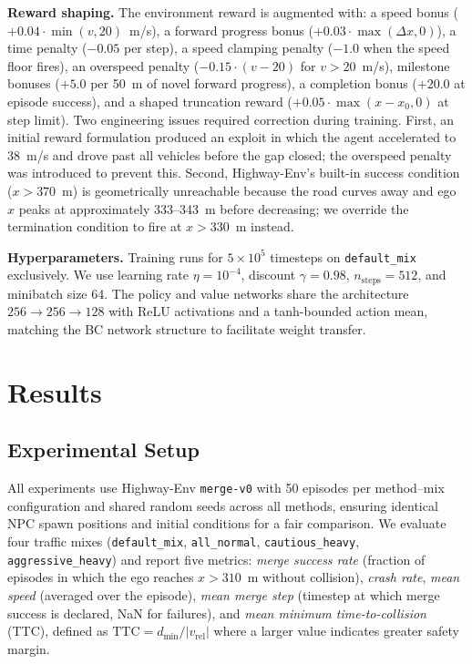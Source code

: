 \documentclass[conference]{IEEEtran}
\begin{document}
\textbf{Reward shaping.}
The environment reward is augmented with: a speed bonus
($+0.04 \cdot \min(v, 20)$~m/s), a forward progress bonus
($+0.03 \cdot \max(\Delta x, 0)$), a time penalty ($-0.05$ per step),
a speed clamping penalty ($-1.0$ when the speed floor fires), an
overspeed penalty ($-0.15 \cdot (v - 20)$ for $v > 20$~m/s), milestone
bonuses ($+5.0$ per 50~m of novel forward progress), a completion bonus
($+20.0$ at episode success), and a shaped truncation reward
($+0.05 \cdot \max(x - x_0, 0)$ at step limit).
Two engineering issues required correction during training.
First, an initial reward formulation produced an exploit in which the
agent accelerated to 38~m/s and drove past all vehicles before the gap
closed; the overspeed penalty was introduced to prevent this.
Second, Highway-Env's built-in success condition ($x > 370$~m) is
geometrically unreachable because the road curves away and ego $x$
peaks at approximately 333--343~m before decreasing; we override the
termination condition to fire at $x > 330$~m instead.

\textbf{Hyperparameters.}
Training runs for $5 \times 10^5$ timesteps on \texttt{default\_mix}
exclusively.
We use learning rate $\eta = 10^{-4}$, discount $\gamma = 0.98$,
$n_{\text{steps}} = 512$, and minibatch size 64.
The policy and value networks share the architecture
$256 \to 256 \to 128$ with ReLU activations and a tanh-bounded action
mean, matching the BC network structure to facilitate weight transfer.

\section{Results}
\label{sec:results}

\subsection{Experimental Setup}

All experiments use Highway-Env \texttt{merge-v0} \cite{leurent2018highway}
with 50 episodes per method–mix configuration and shared random seeds across
all methods, ensuring identical NPC spawn positions and initial conditions
for a fair comparison.
We evaluate four traffic mixes (\texttt{default\_mix}, \texttt{all\_normal},
\texttt{cautious\_heavy}, \texttt{aggressive\_heavy}) and report five metrics:
\emph{merge success rate} (fraction of episodes in which the ego reaches
$x > 310$~m without collision), \emph{crash rate}, \emph{mean speed}
(averaged over the episode), \emph{mean merge step} (timestep at which
merge success is declared, NaN for failures), and \emph{mean minimum
time-to-collision} (TTC), defined as $\text{TTC} = d_{\min} / |v_{\text{rel}}|$
where a larger value indicates greater safety margin.
\end{document}
